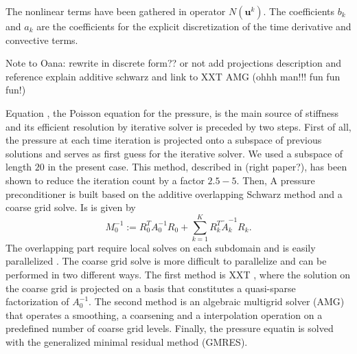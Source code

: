 \documentclass{sig-alternate}
\begin{document}
The nonlinear terms have been gathered in operator $N \left( \mathbf{u}^{k} \right)$. The coefficients $b_k$ and $a_k$ are the coefficients for the explicit discretization of the time derivative and convective terms.

Note to Oana: rewrite in discrete form?? or not
add projections description and reference
explain additive schwarz and link to XXT AMG (ohhh man!!! fun fun fun!)

Equation , the Poisson equation for the pressure, is the main source of stiffness and its efficient resolution by iterative solver is preceded by two steps. First of all, the pressure at each time iteration is projected onto a subspace of previous solutions and serves as first guess for the iterative solver. We used a subspace of length $20$ in the present case. This method, described in \cite{tufo:terascale} (right paper?), has been shown to reduce the iteration count by a factor $2.5-5$. Then, A pressure preconditioner is built based on the additive overlapping Schwarz method and a coarse grid solve. Is is given by 
\begin{equation}
 M_0^{-1} := R_0^T A_{0}^{-1} R_0 + \sum_{k=1}^{K} R_k^T \tilde{A}_k^{-1} R_k.
\end{equation}
The overlapping part require local solves on each subdomain and is easily parallelized \cite{Fischer199784,Fischer2005}. The coarse grid solve is more difficult to parallelize and can be performed in two different ways. The first method is XXT \cite{Tufo2001151}, where the solution on the coarse grid is projected on a basis that constitutes a quasi-sparse factorization of $A_0^{-1}$. The second method is an algebraic multigrid solver (AMG) that operates a smoothing, a coarsening and a interpolation operation on a predefined number of coarse grid levels. Finally, the pressure equatin is solved with the generalized minimal residual method (GMRES).
\end{document}
